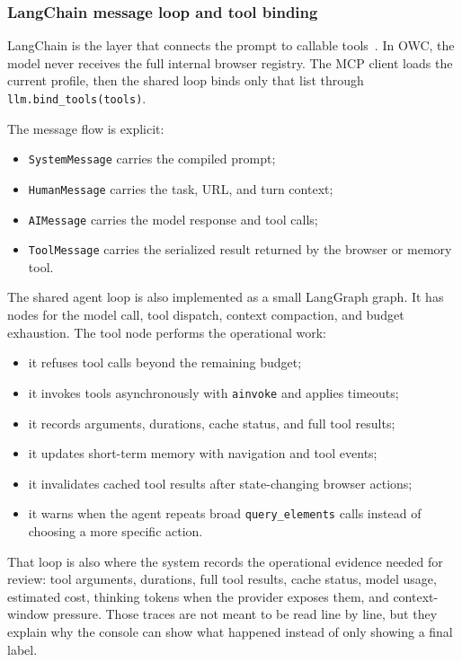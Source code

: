 

\subsubsection{LangChain message loop and tool binding}

LangChain is the layer that connects the prompt to callable tools~\cite{langchain-docs}.
In OWC, the model never receives the full internal browser registry. The MCP client loads
the current profile, then the shared loop binds only that list through
\texttt{llm.bind\_tools(tools)}.

The message flow is explicit:
\begin{itemize}
  \item \texttt{SystemMessage} carries the compiled prompt;
  \item \texttt{HumanMessage} carries the task, URL, and turn context;
  \item \texttt{AIMessage} carries the model response and tool calls;
  \item \texttt{ToolMessage} carries the serialized result returned by the browser or
  memory tool.
\end{itemize}

The shared agent loop is also implemented as a small LangGraph graph. It has nodes for
the model call, tool dispatch, context compaction, and budget exhaustion. The tool node
performs the operational work:
\begin{itemize}
  \item it refuses tool calls beyond the remaining budget;
  \item it invokes tools asynchronously with \texttt{ainvoke} and applies timeouts;
  \item it records arguments, durations, cache status, and full tool results;
  \item it updates short-term memory with navigation and tool events;
  \item it invalidates cached tool results after state-changing browser actions;
  \item it warns when the agent repeats broad \texttt{query\_elements} calls instead of
  choosing a more specific action.
\end{itemize}

That loop is also where the system records the operational evidence needed for review:
tool arguments, durations, full tool results, cache status, model usage, estimated cost,
thinking tokens when the provider exposes them, and context-window pressure. Those
traces are not meant to be read line by line, but they explain why the console can show
what happened instead of only showing a final label.

